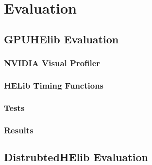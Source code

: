 \chapter{Evaluation}
\section{GPUHElib Evaluation}
\subsection{NVIDIA Visual Profiler}
\subsection{HELib Timing Functions}
\subsection{Tests}
\subsection{Results}
\section{DistrubtedHElib Evaluation}